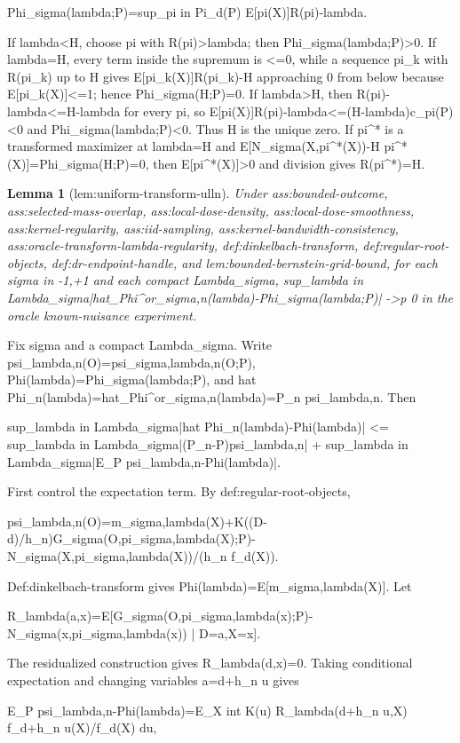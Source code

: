 \documentclass{article}
\newtheorem{lemma}{Lemma}
\begin{document}
Phi_sigma(lambda;P)=sup_{pi in Pi_d(P)} E[pi(X)]{R(pi)-lambda}.

If lambda<H, choose pi with R(pi)>lambda; then Phi_sigma(lambda;P)>0. If lambda=H, every term inside the supremum is <=0, while a sequence pi_k with R(pi_k) up to H gives E[pi_k(X)]{R(pi_k)-H} approaching 0 from below because E[pi_k(X)]<=1; hence Phi_sigma(H;P)=0. If lambda>H, then R(pi)-lambda<=H-lambda for every pi, so E[pi(X)]{R(pi)-lambda}<=(H-lambda)c_pi(P)<0 and Phi_sigma(lambda;P)<0. Thus H is the unique zero. If pi^* is a transformed maximizer at lambda=H and E[N_sigma(X,pi^*(X))-H pi^*(X)]=Phi_sigma(H;P)=0, then E[pi^*(X)]>0 and division gives R(pi^*)=H.

\begin{lemma}[lem:uniform-transform-ulln]\label{lem:uniform-transform-ulln}
Under ass:bounded-outcome, ass:selected-mass-overlap, ass:local-dose-density, ass:local-dose-smoothness, ass:kernel-regularity, ass:iid-sampling, ass:kernel-bandwidth-consistency, ass:oracle-transform-lambda-regularity, def:dinkelbach-transform, def:regular-root-objects, def:dr-endpoint-handle, and lem:bounded-bernstein-grid-bound, for each sigma in {-1,+1} and each compact Lambda_sigma, sup_{lambda in Lambda_sigma}|hat_Phi^or_{sigma,n}(lambda)-Phi_sigma(lambda;P)| ->p 0 in the oracle known-nuisance experiment.
\end{lemma}
Fix sigma and a compact Lambda_sigma. Write psi_{lambda,n}(O)=psi_{sigma,lambda,n}(O;P), Phi(lambda)=Phi_sigma(lambda;P), and hat Phi_n(lambda)=hat_Phi^or_{sigma,n}(lambda)=P_n psi_{lambda,n}. Then

sup_{lambda in Lambda_sigma}|hat Phi_n(lambda)-Phi(lambda)| <= sup_{lambda in Lambda_sigma}|(P_n-P)psi_{lambda,n}| + sup_{lambda in Lambda_sigma}|E_P psi_{lambda,n}-Phi(lambda)|.

First control the expectation term. By def:regular-root-objects,

psi_{lambda,n}(O)=m_{sigma,lambda}(X)+K((D-d)/h_n){G_sigma(O,pi_{sigma,lambda}(X);P)-N_sigma(X,pi_{sigma,lambda}(X))}/(h_n f_d(X)).

Def:dinkelbach-transform gives Phi(lambda)=E[m_{sigma,lambda}(X)]. Let

R_lambda(a,x)=E[G_sigma(O,pi_{sigma,lambda}(x);P)-N_sigma(x,pi_{sigma,lambda}(x)) | D=a,X=x].

The residualized construction gives R_lambda(d,x)=0. Taking conditional expectation and changing variables a=d+h_n u gives

E_P psi_{lambda,n}-Phi(lambda)=E_X int K(u) R_lambda(d+h_n u,X) f_{d+h_n u}(X)/f_d(X) du,
\end{document}
